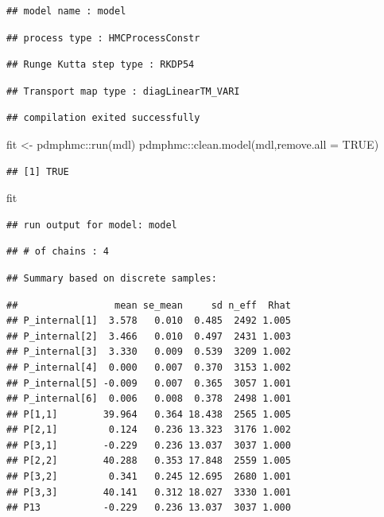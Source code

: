 \documentclass[
]{book}
\newenvironment{Shaded}{\begin{snugshade}}{\end{snugshade}}
\newcommand{\AttributeTok}[1]{\textcolor[rgb]{0.77,0.63,0.00}{#1}}
\newcommand{\ConstantTok}[1]{\textcolor[rgb]{0.00,0.00,0.00}{#1}}
\newcommand{\FunctionTok}[1]{\textcolor[rgb]{0.00,0.00,0.00}{#1}}
\newcommand{\NormalTok}[1]{#1}
\newcommand{\OtherTok}[1]{\textcolor[rgb]{0.56,0.35,0.01}{#1}}
\newcommand{\SpecialCharTok}[1]{\textcolor[rgb]{0.00,0.00,0.00}{#1}}
\begin{document}
\begin{verbatim}
## model name : model
\end{verbatim}

\begin{verbatim}
## process type : HMCProcessConstr
\end{verbatim}

\begin{verbatim}
## Runge Kutta step type : RKDP54
\end{verbatim}

\begin{verbatim}
## Transport map type : diagLinearTM_VARI
\end{verbatim}

\begin{verbatim}
## compilation exited successfully
\end{verbatim}

\begin{Shaded}
\begin{Highlighting}[]
\NormalTok{fit }\OtherTok{\textless{}{-}}\NormalTok{ pdmphmc}\SpecialCharTok{::}\FunctionTok{run}\NormalTok{(mdl)}
\NormalTok{pdmphmc}\SpecialCharTok{::}\FunctionTok{clean.model}\NormalTok{(mdl,}\AttributeTok{remove.all =} \ConstantTok{TRUE}\NormalTok{)}
\end{Highlighting}
\end{Shaded}

\begin{verbatim}
## [1] TRUE
\end{verbatim}

\begin{Shaded}
\begin{Highlighting}[]
\NormalTok{fit}
\end{Highlighting}
\end{Shaded}

\begin{verbatim}
## run output for model: model
\end{verbatim}

\begin{verbatim}
## # of chains : 4
\end{verbatim}

\begin{verbatim}
## Summary based on discrete samples:
\end{verbatim}

\begin{verbatim}
##                 mean se_mean     sd n_eff  Rhat
## P_internal[1]  3.578   0.010  0.485  2492 1.005
## P_internal[2]  3.466   0.010  0.497  2431 1.003
## P_internal[3]  3.330   0.009  0.539  3209 1.002
## P_internal[4]  0.000   0.007  0.370  3153 1.002
## P_internal[5] -0.009   0.007  0.365  3057 1.001
## P_internal[6]  0.006   0.008  0.378  2498 1.001
## P[1,1]        39.964   0.364 18.438  2565 1.005
## P[2,1]         0.124   0.236 13.323  3176 1.002
## P[3,1]        -0.229   0.236 13.037  3037 1.000
## P[2,2]        40.288   0.353 17.848  2559 1.005
## P[3,2]         0.341   0.245 12.695  2680 1.001
## P[3,3]        40.141   0.312 18.027  3330 1.001
## P13           -0.229   0.236 13.037  3037 1.000
\end{verbatim}
\end{document}
